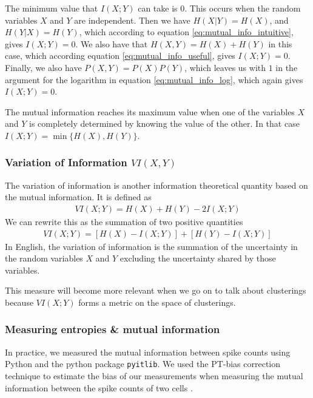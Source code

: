 \documentclass[a4paper,12pt]{article}
\theoremstyle{definition}
\begin{document}
        The minimum value that $I(X;Y)$ can take is $0$. This occurs when the random variables $X$ and $Y$ are independent. Then we have $H(X|Y) = H(X)$, and $H(Y|X) = H(Y)$, which according to equation \ref{eq:mutual_info_intuitive}, gives $I(X;Y) = 0$. We also have that $H(X,Y) = H(X) + H(Y)$ in this case, which according equation \ref{eq:mutual_info_useful}, gives $I(X;Y) = 0$. Finally, we also have $P(X,Y) = P(X)P(Y)$, which leaves us with $1$ in the argument for the logarithm in equation \ref{eq:mutual_info_log}, which again gives $I(X;Y) = 0$.

        The mutual information reaches its maximum value when one of the variables $X$ and $Y$ is completely determined by knowing the value of the other. In that case $I(X;Y) = \min \lbrace H(X), H(Y) \rbrace$.

        \subsubsection{Variation of Information $VI(X,Y)$}\label{sec:variation_of_information}
        The variation of information is another information theoretical quantity based on the mutual information. It is defined as
        \begin{align}\label{eq:variation_of_information}
            VI(X;Y) = H(X) + H(Y) - 2 I(X;Y)
        \end{align}
        We can rewrite this as the summation of two positive quantities
        \begin{align}
            VI(X;Y) = \left[ H(X) - I(X;Y) \right] + \left[ H(Y) - I(X;Y) \right]
        \end{align}
        In English, the variation of information is the summation of the uncertainty in the random variables $X$ and $Y$ excluding the uncertainty shared by those variables.

        This measure will become more relevant when we go on to talk about clusterings because $VI(X;Y)$ forms a metric on the space of clusterings.

        \subsubsection{Measuring entropies \& mutual information}
        In practice, we measured the mutual information between spike counts using Python and the python package \texttt{pyitlib}. We used the PT-bias correction technique to estimate the bias of our measurements when measuring the mutual information between the spike counts of two cells \cite{treves}.
\end{document}
